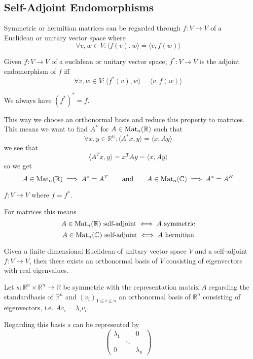 \subsection{Self-Adjoint Endomorphisms}
Symmetric or hermitian matrices can be regarded through \(f: V \to V\) of a Euclidean or unitary vector space where
\[\forall v, w \in V: \langle f(v), w\rangle = \langle v, f(w)\rangle\]

\begin{definition}
   Given \(f: V \to V\) of a euclidean or unitary vector space, \(f^\ast: V \to V\) is the adjoint endomorphism of \(f\) iff
   \[\forall v, w \in V: \langle f^\ast(v), w\rangle = \langle v, f(w)\rangle\]
\end{definition}
\begin{remark}
   We always have \((f^\ast)^\ast = f\).
\end{remark}

This way we choose an orthonormal basis and reduce this property to matrices.
This means we want to find \(A^\ast\) for \(A \in \operatorname{Mat}_n(\mathbb{R})\) such that
\[\forall x, y \in \mathbb{R}^n: \langle A^\ast x, y\rangle = \langle x, Ay\rangle\]
we see that
\[\langle A^Tx, y \rangle = x^TAy = \langle x, Ay\rangle\]
so we get
\[A \in \operatorname{Mat}_n(\mathbb{R}) \implies A^\ast = A^T \qquad\text{and}\qquad A \in \operatorname{Mat}_n(\mathbb{C}) \implies A^\ast = A^H\]

\begin{definition}
   \(f: V \to V\) where \(f = f^\ast\).
\end{definition}
\begin{remark}
   For matrices this means
   \[A \in \operatorname{Mat}_n(\mathbb{R})~\text{self-adjoint} \iff A~\text{symmetric}\]
   \[A \in \operatorname{Mat}_n(\mathbb{C})~\text{self-adjoint} \iff A~\text{hermitian}\]
\end{remark}

\begin{proposition}\label{pro:spectral_thm}
   Given a finite dimensional Euclidean of unitary vector space \(V\) and a self-adjoint \(f: V \to V\), then there exists an orthonormal basis of \(V\) consisting of eigenvectors with real eigenvalues.
\end{proposition}

\begin{proposition}
   Let \(s: \mathbb{R}^n\times\mathbb{R}^n \to \mathbb{R}\) be symmetric with the representation matrix \(A\) regarding the standardbasis of \(\mathbb{R}^n\) and \((v_i)_{1 \leq i \leq n}\) an orthonormal basis of \(\mathbb{R}^n\) consisting of eigenvectors, i.e. \(A v_i = \lambda_i v_i\).

   Regarding this basis \(s\) can be represented by
   \[\begin{pmatrix}\lambda_1 & & 0\\ & \ddots & \\ 0 & & \lambda_n\end{pmatrix}\]
\end{proposition}

